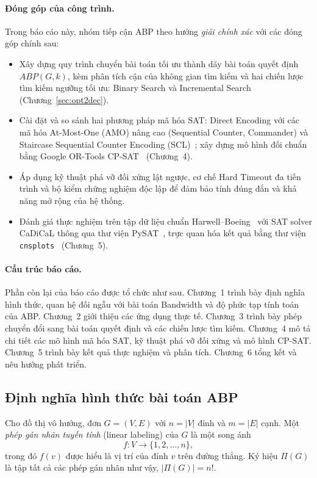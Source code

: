 \documentclass[a4paper,fleqn]{cas-sc}
\begin{document}
\paragraph{Đóng góp của công trình.} Trong báo cáo này, nhóm tiếp cận ABP theo hướng \emph{giải chính xác} với các đóng góp chính sau:
\begin{itemize}
  \item Xây dựng quy trình chuyển bài toán tối ưu thành dãy bài toán quyết định $ABP(G, k)$, kèm phân tích cận của không gian tìm kiếm và hai chiến lược tìm kiếm ngưỡng tối ưu: Binary Search và Incremental Search (Chương~\ref{sec:opt2dec}).
  \item Cài đặt và so sánh hai phương pháp mã hóa SAT: Direct Encoding với các mã hóa At-Most-One (AMO) nâng cao (Sequential Counter, Commander) và Staircase Sequential Counter Encoding (SCL)~\cite{truong2025}; xây dựng mô hình đối chuẩn bằng Google OR-Tools CP-SAT~\cite{ortools} (Chương~4).
  \item Áp dụng kỹ thuật phá vỡ đối xứng lật ngược, cơ chế Hard Timeout đa tiến trình và bộ kiểm chứng nghiệm độc lập để đảm bảo tính đúng đắn và khả năng mở rộng của hệ thống.
  \item Đánh giá thực nghiệm trên tập dữ liệu chuẩn Harwell--Boeing~\cite{harwellboeing} với SAT solver CaDiCaL thông qua thư viện PySAT~\cite{pysat}, trực quan hóa kết quả bằng thư viện \texttt{cnsplots}~\cite{cnsplots} (Chương~5).
\end{itemize}

\paragraph{Cấu trúc báo cáo.} Phần còn lại của báo cáo được tổ chức như sau. Chương~1 trình bày định nghĩa hình thức, quan hệ đối ngẫu với bài toán Bandwidth và độ phức tạp tính toán của ABP. Chương~2 giới thiệu các ứng dụng thực tế. Chương~3 trình bày phép chuyển đổi sang bài toán quyết định và các chiến lược tìm kiếm. Chương~4 mô tả chi tiết các mô hình mã hóa SAT, kỹ thuật phá vỡ đối xứng và mô hình CP-SAT. Chương~5 trình bày kết quả thực nghiệm và phân tích. Chương~6 tổng kết và nêu hướng phát triển.

\subsection{Định nghĩa hình thức bài toán ABP}
\label{sec:definition}
Cho đồ thị vô hướng, đơn $G = (V, E)$ với $n = |V|$ đỉnh và $m = |E|$ cạnh. Một \emph{phép gán nhãn tuyến tính} (linear labeling) của $G$ là một song ánh
\begin{equation}
f : V \to \{1, 2, \dots, n\},
\end{equation}
trong đó $f(v)$ được hiểu là vị trí của đỉnh $v$ trên đường thẳng. Ký hiệu $\Pi(G)$ là tập tất cả các phép gán nhãn như vậy, $|\Pi(G)| = n!$.
\end{document}
